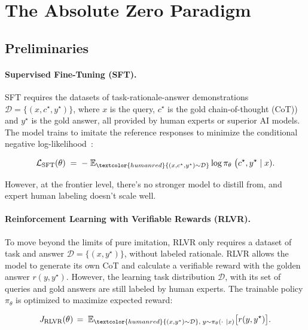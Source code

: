 \documentclass{article}
\begin{document}
\section{The Absolute Zero Paradigm}
\label{sec:paradigm}
\subsection{Preliminaries}
\label{sec:prelims}

\paragraph{Supervised Fine-Tuning (SFT).}
SFT requires the datasets of task-rationale-answer demonstrations $\mathcal{D}=\{(x, c^\star,y^\star)\}$, where \(x\) is the query, \(c^\star\) is the gold chain-of-thought (CoT)) and \(y^\star\) is the gold answer, all provided by \textcolor{humanred}{human experts} or \textcolor{humanred}{superior AI models}. The model trains to imitate the reference responses to minimize the conditional negative log-likelihood~\citep{ouyang2022training}:

\begin{align}
\mathcal{L}_{\text{SFT}}(\theta) \;=\;
-\;\mathbb{E}_{\textcolor{humanred}{(x,c^\star,y^\star)\sim\mathcal{D}}}
\log \pi_\theta\;\bigl(c^\star,y^\star\mid x).
\end{align}

However, at the frontier level, there’s no stronger model to distill from, and expert human labeling doesn’t scale well.

\paragraph{Reinforcement Learning with Verifiable Rewards (RLVR).} 
To move beyond the limits of pure imitation, RLVR only requires a dataset of task and answer $\mathcal{D}=\{(x, y^\star)\}$, without labeled rationale. RLVR allows the model to generate its own CoT and calculate a verifiable reward with the golden answer $r(y, y^\star)$. However, the learning task distribution \(\mathcal{D}\), with its set of queries and gold answers are still labeled by \textcolor{humanred}{human experts}.
The trainable policy $\pi_\theta$ is optimized to maximize expected reward:

\begin{align}
J_{\text{RLVR}}(\theta)
\,=\;
\mathbb{E}_{\textcolor{humanred}{(x,y^\star)\sim\mathcal{D}},\;y\sim\pi_\theta(\cdot\ \mid x)}
\bigl[r(y,y^\star)\bigr].
\end{align}
\end{document}
